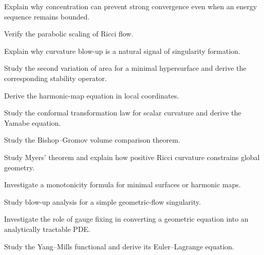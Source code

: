 \begin{exercise}[3]
Explain why concentration can prevent strong convergence even when an
energy sequence remains bounded.
\end{exercise}

\begin{exercise}[3]
Verify the parabolic scaling of Ricci flow.
\end{exercise}

\begin{exercise}[3]
Explain why curvature blow-up is a natural signal of singularity
formation.
\end{exercise}

\begin{exercise}[4]
Study the second variation of area for a minimal hypersurface and derive
the corresponding stability operator.
\end{exercise}

\begin{exercise}[4]
Derive the harmonic-map equation in local coordinates.
\end{exercise}

\begin{exercise}[4]
Study the conformal transformation law for scalar curvature and derive
the Yamabe equation.
\end{exercise}

\begin{exercise}[4]
Study the Bishop--Gromov volume comparison theorem.
\end{exercise}

\begin{exercise}[4]
Study Myers' theorem and explain how positive Ricci curvature constrains
global geometry.
\end{exercise}

\begin{exercise}[4]
Investigate a monotonicity formula for minimal surfaces or harmonic maps.
\end{exercise}

\begin{exercise}[4]
Study blow-up analysis for a simple geometric-flow singularity.
\end{exercise}

\begin{exercise}[4]
Investigate the role of gauge fixing in converting a geometric equation
into an analytically tractable PDE.
\end{exercise}

\begin{exercise}[4]
Study the Yang--Mills functional and derive its Euler--Lagrange equation.
\end{exercise}

